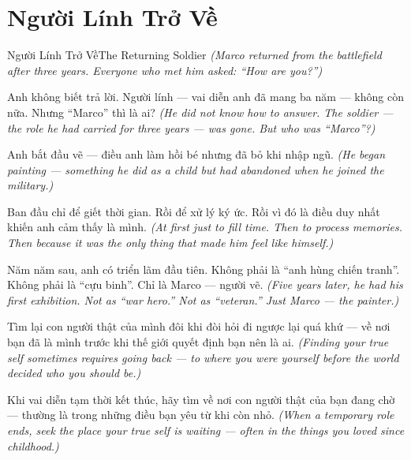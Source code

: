 \section{Người Lính Trở Về}
\begin{truyen}{Người Lính Trở Về}{The Returning Soldier}
\textit{(Marco returned from the battlefield after three years. Everyone who met him asked: ``How are you?'')}

Anh không biết trả lời. Người lính — vai diễn anh đã mang ba năm — không còn nữa. Nhưng ``Marco'' thì là ai?
\textit{(He did not know how to answer. The soldier — the role he had carried for three years — was gone. But who was ``Marco''?)}

Anh bắt đầu vẽ — điều anh làm hồi bé nhưng đã bỏ khi nhập ngũ.
\textit{(He began painting — something he did as a child but had abandoned when he joined the military.)}

Ban đầu chỉ để giết thời gian. Rồi để xử lý ký ức. Rồi vì đó là điều duy nhất khiến anh cảm thấy là mình.
\textit{(At first just to fill time. Then to process memories. Then because it was the only thing that made him feel like himself.)}

Năm năm sau, anh có triển lãm đầu tiên. Không phải là ``anh hùng chiến tranh''. Không phải là ``cựu binh''. Chỉ là Marco — người vẽ.
\textit{(Five years later, he had his first exhibition. Not as ``war hero.'' Not as ``veteran.'' Just Marco — the painter.)}

Tìm lại con người thật của mình đôi khi đòi hỏi đi ngược lại quá khứ — về nơi bạn đã là mình trước khi thế giới quyết định bạn nên là ai.
\textit{(Finding your true self sometimes requires going back — to where you were yourself before the world decided who you should be.)}

\end{truyen}

\begin{baihoc}
Khi vai diễn tạm thời kết thúc, hãy tìm về nơi con người thật của bạn đang chờ — thường là trong những điều bạn yêu từ khi còn nhỏ.
\textit{(When a temporary role ends, seek the place your true self is waiting — often in the things you loved since childhood.)}
\end{baihoc}
\ngancach


